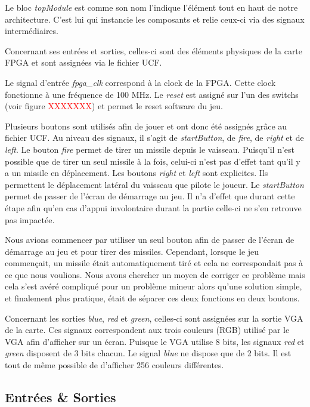 \documentclass[french]{nakrule}
\begin{document}
Le bloc \emph{topModule} est comme son nom l'indique l'élément tout en haut de notre architecture. C'est lui qui instancie les composants et relie ceux-ci via des signaux intermédiaires. 

Concernant ses entrées et sorties, celles-ci sont des éléments physiques de la carte FPGA et sont assignées via le fichier UCF. 

Le signal d'entrée \emph{fpga\_clk} correspond à la clock de la FPGA. Cette
clock fonctionne à une fréquence de 100 MHz. Le \emph{reset} est assigné sur l'un des switchs (voir figure \textcolor{red}{XXXXXXX}) et permet le reset software du jeu.

Plusieurs boutons sont utilisés afin de jouer et ont donc été assignés grâce au fichier UCF. Au niveau des signaux, il s'agit de \emph{startButton}, de \emph{fire}, de \emph{right} et de \emph{left}. 
Le bouton \emph{fire} permet de tirer un missile depuis le vaisseau. Puisqu'il n'est possible que de tirer un seul missile à la fois, celui-ci n'est pas d'effet tant qu'il y a un missile en déplacement. 
Les boutons \emph{right} et \emph{left} sont explicites. Ils permettent le déplacement latéral du vaisseau que pilote le joueur.
Le \emph{startButton} permet de passer de l'écran de démarrage au jeu. Il n'a d'effet que durant cette étape afin qu'en cas d'appui involontaire durant la partie celle-ci ne s'en retrouve pas impactée.

Nous avions commencer par utiliser un seul bouton afin de passer de l'écran de démarrage au jeu et pour tirer des missiles. Cependant, lorsque le jeu commençait, un missile était automatiquement tiré et cela ne correspondait pas à ce que nous voulions. Nous avons chercher un moyen de corriger ce problème mais cela s'est avéré compliqué pour un problème mineur alors qu'une solution simple, et finalement plus pratique, était de séparer ces deux fonctions en deux boutons.

Concernant les sorties \emph{blue}, \emph{red} et \emph{green}, celles-ci sont assignées sur la sortie VGA de la carte. Ces signaux correspondent aux trois couleurs (RGB) utilisé par le VGA afin d'afficher sur un écran. Puisque le VGA utilise 8 bits, les signaux \emph{red} et \emph{green} disposent de 3 bits chacun. Le signal \emph{blue} ne dispose que de 2 bits.
Il est tout de même possible de d'afficher 256 couleurs différentes.

\subsection{Entrées \& Sorties}
\label{subsec:Entrees_Sorties_topModule}
\end{document}
